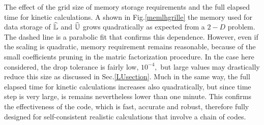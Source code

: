 
The effect of the grid size of memory storage requirements and the full
elapsed time for kinetic calculations. A shown in Fig.\ref{memlhgrille} the
memory used for data storage of $\widehat{\Bbb{L}}$ and $\widehat{\Bbb{U}}$
grows quadratically as expected from a $2-D$ problem. The dashed line is a
parabolic fit that confirms this dependence. However, even if the scaling is
quadratic, memory requirement remains reasonable, because of the small
coefficients pruning in the matric factorization procedure. In the case here
considered, the drop tolerance is fairly low, $10^{-4},$ but large values
may drastically reduce this size as discussed in Sec.\ref{LUsection}. Much
in the same way, the full elapsed time for kinetic calculations increases
also quadratically, but since time step is very large, is remains
nevertheless lower than one minute. This confirms the effectiveness of the
code, which is fast, accurate and robust, therefore fully designed for
self-consistent realistic calculations that involve a chain of codes.


